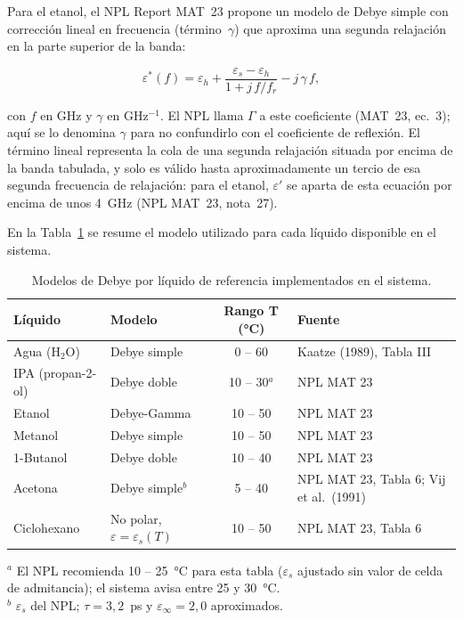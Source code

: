 Para el etanol, el NPL Report MAT~23 propone un modelo de Debye simple con
corrección lineal en frecuencia (término~$\gamma$) que aproxima una segunda
relajación en la parte superior de la banda:

\begin{equation}
    \varepsilon^*(f) = \varepsilon_h
                     + \frac{\varepsilon_s - \varepsilon_h}{1 + j\,f / f_r}
                     - j\,\gamma\,f,
    \label{eq:debye_gamma}
\end{equation}

\noindent con $f$ en GHz y $\gamma$ en GHz$^{-1}$. El NPL llama $\Gamma$ a este
coeficiente (MAT~23, ec.~3); aquí se lo denomina $\gamma$ para no confundirlo con
el coeficiente de reflexión. El término lineal representa la cola de una segunda
relajación situada por encima de la banda tabulada, y solo es válido hasta
aproximadamente un tercio de esa segunda frecuencia de relajación: para el
etanol, $\varepsilon'$ se aparta de esta ecuación por encima de unos 4~GHz
(NPL MAT~23, nota~27).

En la Tabla~\ref{tab:modelos_debye} se resume el modelo utilizado para cada
líquido disponible en el sistema.

\begin{table}[h!]
\centering
\caption{Modelos de Debye por líquido de referencia implementados en el sistema.}
\label{tab:modelos_debye}
\small
\begin{tabular}{@{}p{3.1cm}p{3.4cm}cp{4.6cm}@{}}
\toprule
\textbf{Líquido} & \textbf{Modelo} & \textbf{Rango T (°C)} & \textbf{Fuente} \\
\midrule
Agua (H$_2$O) & Debye simple       & 0 -- 60  & Kaatze (1989), Tabla III \cite{kaatze1989} \\
IPA (propan-2-ol) & Debye doble    & 10 -- 30$^{a}$ & NPL MAT 23 \cite{gregory2012} \\
Etanol         & Debye-Gamma        & 10 -- 50 & NPL MAT 23 \cite{gregory2012} \\
Metanol        & Debye simple       & 10 -- 50 & NPL MAT 23 \cite{gregory2012} \\
1-Butanol      & Debye doble        & 10 -- 40 & NPL MAT 23 \cite{gregory2012} \\
Acetona        & Debye simple$^{b}$ & 5 -- 40  & NPL MAT 23, Tabla 6; Vij et al.\ (1991) \cite{vij1991} \\
Ciclohexano    & No polar, $\varepsilon = \varepsilon_s(T)$ & 10 -- 50 & NPL MAT 23, Tabla 6 \cite{gregory2012} \\
\bottomrule
\end{tabular}

\vspace{2pt}
{\footnotesize $^{a}$ El NPL recomienda 10 -- 25~°C para esta tabla ($\varepsilon_s$
ajustado sin valor de celda de admitancia); el sistema avisa entre 25 y 30~°C.\\
$^{b}$ $\varepsilon_s$ del NPL; $\tau = 3{,}2$~ps y $\varepsilon_\infty = 2{,}0$ aproximados.}
\end{table}


